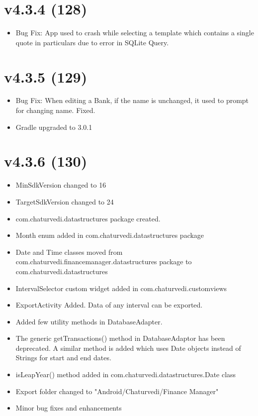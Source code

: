 \documentclass{article}
\begin{document}
\section{v4.3.4 (128)}
\begin{itemize}
\item Bug Fix: App used to crash while selecting a template which contains a single quote in particulars due to error in SQLite Query.
\end{itemize}

\section{v4.3.5 (129)}
\begin{itemize}
\item Bug Fix: When editing a Bank, if the name is unchanged, it used to prompt for changing name. Fixed.
\item Gradle upgraded to 3.0.1
\end{itemize}

\section{v4.3.6 (130)}
\begin{itemize}
\item MinSdkVersion changed to 16
\item TargetSdkVersion changed to 24
\item com.chaturvedi.datastructures package created.
\item Month enum added in com.chaturvedi.datastructures package
\item Date and Time classes moved from com.chaturvedi.financemanager.datastructures package to com.chaturvedi.datastructures
\item IntervalSelector custom widget added in com.chaturvedi.customviews
\item ExportActivity Added. Data of any interval can be exported.
\item Added few utility methods in DatabaseAdapter.
\item The generic getTransactions() method in DatabaseAdaptor has been deprecated. A similar method is added which uses Date objects instead of Strings for start and end dates.
\item isLeapYear() method added in com.chaturvedi.datastructures.Date class
\item Export folder changed to "Android/Chaturvedi/Finance Manager"
\item Minor bug fixes and enhancements
\end{itemize}
\end{document}
